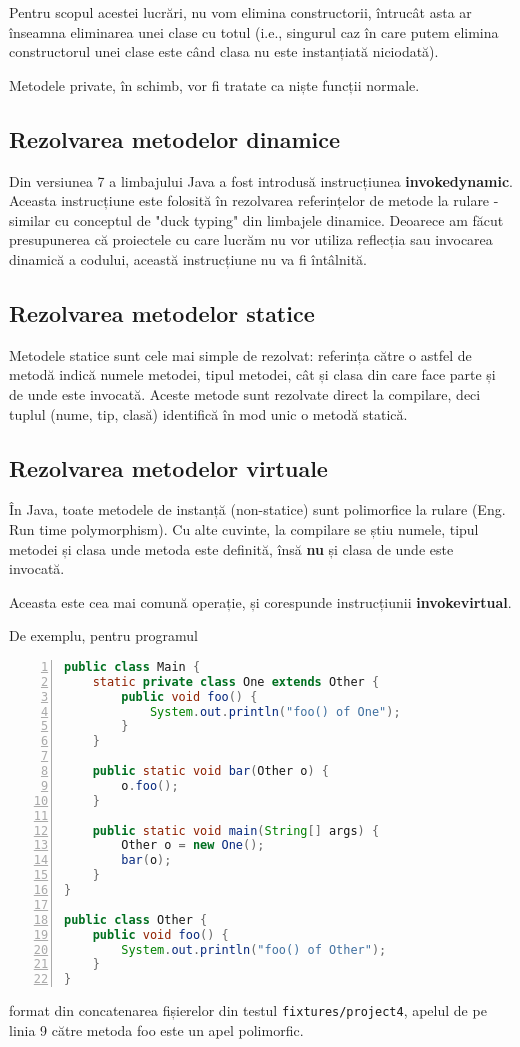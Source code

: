 Pentru scopul acestei lucrări, nu vom elimina constructorii,
întrucât asta ar înseamna eliminarea unei clase cu totul (i.e.,
singurul caz în care putem elimina constructorul unei clase este
când clasa nu este instanțiată niciodată).

Metodele private, în schimb, vor fi tratate ca niște funcții normale.

\subsection{Rezolvarea metodelor dinamice}

Din versiunea 7 a limbajului Java a fost introdusă instrucțiunea
\textbf{invokedynamic}.
Aceasta instrucțiune este folosită în rezolvarea referințelor de metode la
rulare - similar cu conceptul de "duck typing" din limbajele dinamice.
Deoarece am făcut presupunerea că proiectele cu care lucrăm nu vor utiliza
reflecția sau invocarea dinamică a codului, această instrucțiune nu va
fi întâlnită.

\subsection{Rezolvarea metodelor statice}

Metodele statice sunt cele mai simple de rezolvat: referința către o astfel de
metodă indică numele metodei, tipul metodei, cât și clasa din care face parte și
de unde este invocată.
Aceste metode sunt rezolvate direct la compilare, deci tuplul (nume, tip, clasă)
identifică în mod unic o metodă statică.

\subsection{Rezolvarea metodelor virtuale}

În Java, toate metodele de instanță (non-statice) sunt polimorfice la rulare
(Eng. Run time polymorphism).
Cu alte cuvinte, la compilare se știu numele, tipul metodei și clasa unde
metoda este definită, însă \textbf{nu} și clasa de unde este invocată.

Aceasta este cea mai comună operație, și corespunde instrucțiunii
\textbf{invokevirtual}.

De exemplu, pentru programul
\begin{lstlisting}[language=Java, numbers=left, label=program_metode_virtuale]
public class Main {
    static private class One extends Other {
        public void foo() {
            System.out.println("foo() of One");
        }
    }

    public static void bar(Other o) {
        o.foo();
    }

    public static void main(String[] args) {
        Other o = new One();
        bar(o);
    }
}

public class Other {
    public void foo() {
        System.out.println("foo() of Other");
    }
}
\end{lstlisting}
format din concatenarea fișierelor din testul \texttt{fixtures/project4},
apelul de pe linia 9 către metoda foo este un apel polimorfic.

